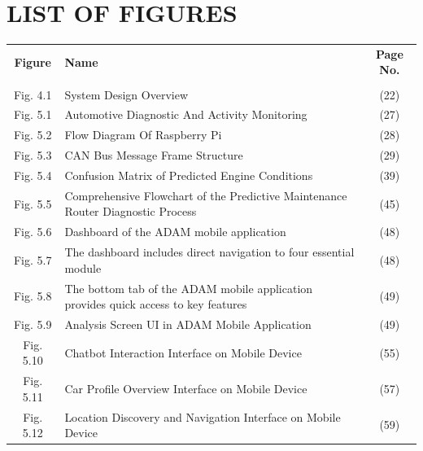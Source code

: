 \newpage
\chapter*{\centering  LIST OF FIGURES}


\begin{center}
    \begin{tabular*}{0.95\textwidth}{@{\extracolsep{\fill}}c p{9cm} c}
        \textbf{Figure} & \textbf{Name} & \textbf{Page No.} \\
        \\[-0.3cm] %
        Fig. 4.1 & System Design Overview & (22) \\
        Fig. 5.1 & Automotive Diagnostic And Activity Monitoring & (27) \\
        Fig. 5.2 & Flow Diagram Of Raspberry Pi & (28) \\
        Fig. 5.3 & CAN Bus Message Frame Structure & (29) \\
        Fig. 5.4 & Confusion Matrix of Predicted Engine Conditions & (39) \\
        Fig. 5.5 & Comprehensive Flowchart of the Predictive Maintenance Router Diagnostic Process & (45) \\
        Fig. 5.6 & Dashboard of the ADAM mobile application & (48) \\
        Fig. 5.7 & The dashboard includes direct navigation to four essential module & (48) \\
        Fig. 5.8 & The bottom tab of the ADAM mobile application provides quick access to key features  & (49) \\
        Fig. 5.9 & Analysis Screen UI in ADAM Mobile Application  & (49) \\
        Fig. 5.10 & Chatbot Interaction Interface on Mobile Device  & (55) \\
        Fig. 5.11 & Car Profile Overview Interface on Mobile Device  & (57) \\
        Fig. 5.12 &Location Discovery and Navigation Interface on Mobile Device  & (59) \\
    \end{tabular*}
\end{center}

